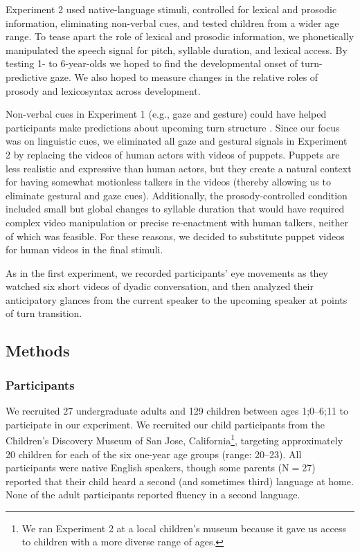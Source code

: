 \documentclass[authoryear, 12pt]{elsarticle}
\begin{document}
Experiment 2 used native-language stimuli, controlled for lexical and prosodic information, eliminating non-verbal cues, and tested children from a wider age range. To tease apart the role of lexical and prosodic information, we phonetically manipulated the speech signal for pitch, syllable duration, and lexical access. By testing 1- to 6-year-olds we hoped to find the developmental onset of turn-predictive gaze. We also hoped to measure changes in the relative roles of prosody and lexicosyntax across development.

Non-verbal cues in Experiment 1 (e.g., gaze and gesture) could have helped participants make predictions about upcoming turn structure  \citep{rossano2009, stivers2010}. Since our focus was on linguistic cues, we eliminated all gaze and gestural signals in Experiment 2 by replacing the videos of human actors with videos of puppets. Puppets are less realistic and expressive than human actors, but they create a natural context for having somewhat motionless talkers in the videos (thereby allowing us to eliminate gestural and gaze cues). Additionally, the prosody-controlled condition included small but global changes to syllable duration that would have required complex video manipulation or precise re-enactment with human talkers, neither of which was feasible. For these reasons, we decided to substitute puppet videos for human videos in the final stimuli. 

As in the first experiment, we recorded participants' eye movements as they watched six short videos of dyadic conversation, and then analyzed their anticipatory glances from the current speaker to the upcoming speaker at points of turn transition.

\subsection{Methods}
\label{sec:methods2}

\subsubsection{Participants}
We recruited 27 undergraduate adults and 129 children between ages 1;0--6;11 to participate in our experiment. We recruited our child participants from the Children's Discovery Museum of San Jose, California\footnote{We ran Experiment 2 at a local children's museum because it gave us access to children with a more diverse range of ages.}, targeting approximately 20 children for each of the six one-year age groups (range: 20--23). All participants were native English speakers, though some parents (N$=$27) reported that their child heard a second (and sometimes third) language at home. None of the adult participants reported fluency in a second language.
\end{document}
